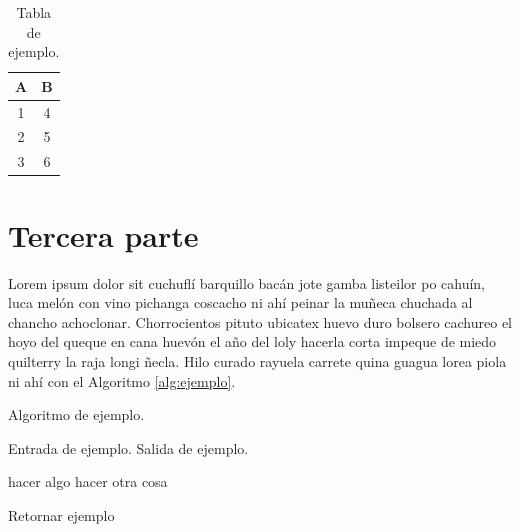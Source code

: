 \begin{table}[!ht]
	\centering
	\caption{Tabla de ejemplo.}
	\begin{tabular}{| c | c |}
		\hline
		A & B \\ \hline
		1 & 4 \\
		2 & 5 \\
		3 & 6 \\\hline
	\end{tabular}
	\label{tab:ejemplo}
\end{table}

\section{Tercera parte}
\label{sec:tercera}

Lorem ipsum dolor sit cuchuflí barquillo bacán jote gamba listeilor po cahuín, luca melón con vino pichanga coscacho ni ahí peinar la muñeca chuchada al chancho achoclonar. Chorrocientos pituto ubicatex huevo duro bolsero cachureo el hoyo del queque en cana huevón el año del loly hacerla corta impeque de miedo quilterry la raja longi ñecla. Hilo curado rayuela carrete quina guagua lorea piola ni ahí con el Algoritmo \ref{alg:ejemplo}.

\begin{algorithm}[!ht]
	\caption{Algoritmo de ejemplo.}
	\label{alg:ejemplo}
	\begin{algorithmic}[1]
	\REQUIRE Entrada de ejemplo.
	\ENSURE Salida de ejemplo.	
	
		\STATE hacer algo
	\ELSE
		\STATE hacer otra cosa
	\ENDIF
	
	\RETURN Retornar ejemplo
	
	\end{algorithmic}
\end{algorithm}